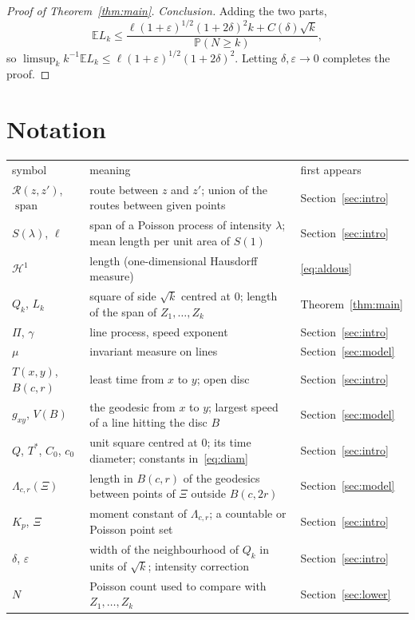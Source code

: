 \documentclass[11pt]{amsart}
\theoremstyle{remark}
\newcommand{\E}{\mathbb{E}}
\newcommand{\Prob}{\mathbb{P}}
\newcommand{\Hone}{\mathcal{H}^1}
\newcommand{\spn}{\operatorname{span}}
\begin{document}
\begin{proof}[Proof of Theorem~\ref{thm:main}]
\emph{Conclusion.} Adding the two parts,
\[
\E L_k\le\frac{\ell(1+\varepsilon)^{1/2}(1+2\delta)^2k+C(\delta)\sqrt k}{\Prob(N\ge k)},
\]
so $\limsup_kk^{-1}\E L_k\le\ell(1+\varepsilon)^{1/2}(1+2\delta)^2$. Letting $\delta,\varepsilon\to0$ completes the
proof.
\end{proof}

\section*{Notation}
\begin{tabular}{@{}p{}p{}p{}@{}}
symbol & meaning & first appears\\
$\mathcal R(z,z')$, $\spn$ & route between $z$ and $z'$; union of the routes between given points & Section~\ref{sec:intro}\\
$S(\lambda)$, $\ell$ & span of a Poisson process of intensity $\lambda$; mean length per unit area of $S(1)$ &
Section~\ref{sec:intro}\\
$\Hone$ & length (one-dimensional Hausdorff measure) & \eqref{eq:aldous}\\
$Q_k$, $L_k$ & square of side $\sqrt k$ centred at $0$; length of the span of $Z_1,\dots,Z_k$ &
Theorem~\ref{thm:main}\\
$\Pi$, $\gamma$ & line process, speed exponent & Section~\ref{sec:intro}\\
$\mu$ & invariant measure on lines & Section~\ref{sec:model}\\
$T(x,y)$, $B(c,r)$ & least time from $x$ to $y$; open disc & Section~\ref{sec:intro}\\
$g_{xy}$, $V(B)$ & the geodesic from $x$ to $y$; largest speed of a line hitting the disc $B$ & Section~\ref{sec:model}\\
$Q$, $T^*$, $C_0$, $c_0$ & unit square centred at $0$; its time diameter; constants in~\eqref{eq:diam} &
Section~\ref{sec:intro}\\
$\Lambda_{c,r}(\Xi)$ & length in $B(c,r)$ of the geodesics between points of $\Xi$ outside $B(c,2r)$ &
Section~\ref{sec:model}\\
$K_p$, $\Xi$ & moment constant of $\Lambda_{c,r}$; a countable or Poisson point set & Section~\ref{sec:intro}\\
$\delta$, $\varepsilon$ & width of the neighbourhood of $Q_k$ in units of $\sqrt k$; intensity correction &
Section~\ref{sec:intro}\\
$N$ & Poisson count used to compare with $Z_1,\dots,Z_k$ & Section~\ref{sec:lower}\\

\end{tabular}
\end{document}
